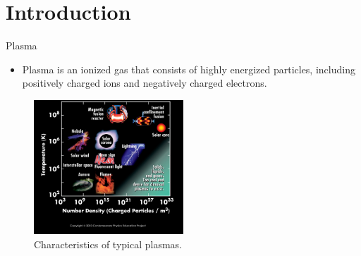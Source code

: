 \section{Introduction}
\begin{frame}{Plasma}
  \begin{itemize}
    \item Plasma is an ionized gas that consists of highly energized particles, including positively charged ions and negatively charged electrons.
  \end{itemize}

  \begin{figure}[htbp]
    \centering
    \includegraphics[width=0.5\textwidth]{../../thesis/img/introduction/plasma-properties}
    \caption{Characteristics of typical plasmas.}
    \label{fig:plasma-properties}
  \end{figure}
\end{frame}

